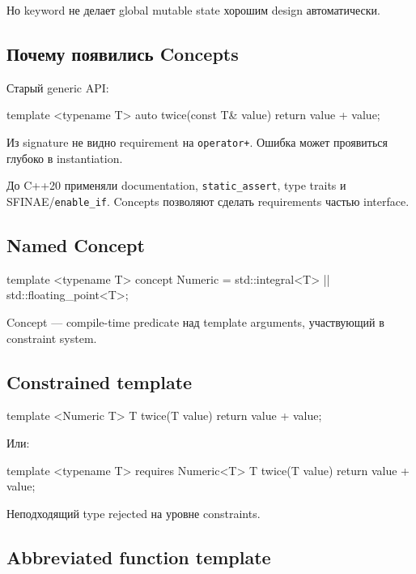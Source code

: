 Но keyword не делает global mutable state хорошим design автоматически.

\subsection{Почему появились Concepts}

Старый generic API:

\begin{cppcode}
template <typename T>
auto twice(const T& value) {
    return value + value;
}
\end{cppcode}

Из signature не видно requirement на \texttt{operator+}. Ошибка может проявиться
глубоко в instantiation.

До C++20 применяли documentation, \texttt{static\_assert}, type traits и
SFINAE/\texttt{enable\_if}. Concepts позволяют сделать requirements частью
interface.

\subsection{Named Concept}

\begin{cppcode}
template <typename T>
concept Numeric =
    std::integral<T> || std::floating_point<T>;
\end{cppcode}

Concept --- compile-time predicate над template arguments, участвующий в
constraint system.

\subsection{Constrained template}

\begin{cppcode}
template <Numeric T>
T twice(T value) {
    return value + value;
}
\end{cppcode}

Или:

\begin{cppcode}
template <typename T>
requires Numeric<T>
T twice(T value) {
    return value + value;
}
\end{cppcode}

Неподходящий type rejected на уровне constraints.

\subsection{Abbreviated function template}

